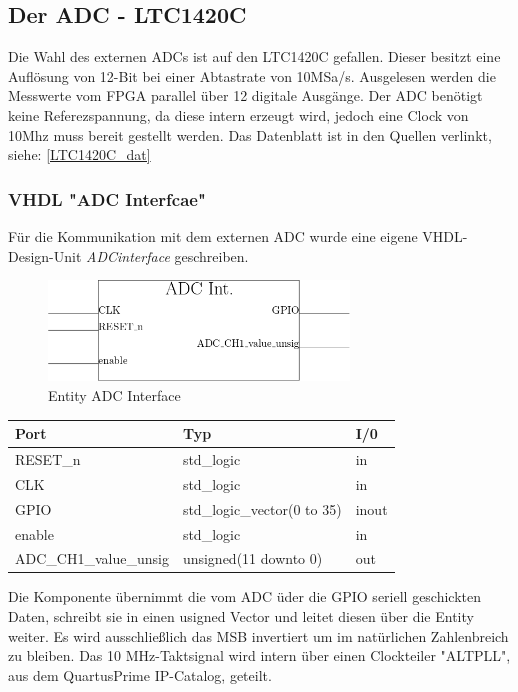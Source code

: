 \subsection{Der ADC - LTC1420C}\label{extADC}
 Die Wahl des externen ADCs ist auf den LTC1420C gefallen. Dieser besitzt eine Auflösung von 12-Bit bei einer Abtastrate von 10MSa/s.  Ausgelesen werden die Messwerte vom FPGA parallel über 12 digitale Ausgänge. Der ADC benötigt keine Referezspannung, da diese intern erzeugt wird, jedoch eine Clock von 10Mhz muss bereit gestellt werden.
Das Datenblatt ist in den Quellen verlinkt, siehe: \ref{LTC1420C_dat}
\subsubsection{VHDL "ADC Interfcae"}
Für die Kommunikation mit dem externen ADC wurde eine eigene VHDL-Design-Unit \textit{ADCinterface} geschreiben.
\begin{figure}[!h]
	\begin{center}
		\includegraphics[width=8cm]{SAUER/Grafiken/ADC_Int.png}
		\caption{Entity ADC Interface}
	\end{center}
\end{figure}
\begin{center}
	\begin{tabular}[h]{|l|l|l|}
		\hline
		Port & Typ & I/0\\
		\hline\hline
		RESET\_n & std\_logic & in\\
		\hline
		CLK & std\_logic & in\\
		\hline
		GPIO & std\_logic\_vector(0 to 35) & inout\\
		\hline
		enable & std\_logic & in\\
		\hline
		ADC\_CH1\_value\_unsig & unsigned(11 downto 0) & out\\
		\hline
	\end{tabular}
\end{center}
Die Komponente übernimmt die vom ADC üder die GPIO seriell geschickten Daten, schreibt sie in einen usigned Vector und leitet diesen über die Entity weiter. Es wird ausschließlich das MSB invertiert um im natürlichen Zahlenbreich zu bleiben. Das 10 MHz-Taktsignal wird intern über einen Clockteiler "ALTPLL", aus dem QuartusPrime  IP-Catalog, geteilt.
